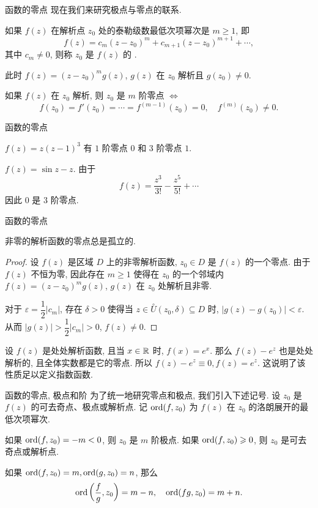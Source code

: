 \begin{frame}{函数的零点}
\onslide<+->
现在我们来研究极点与零点的联系.
\begin{definition}
如果 $f(z)$ 在解析点 $z_0$ 处的泰勒级数最低次项幂次是 $m\ge1$, 即
\[f(z)=c_m(z-z_0)^m+c_{m+1}(z-z_0)^{m+1}+\cdots,\]
其中 $c_m\neq 0$, 则称 $z_0$ 是 $f(z)$ 的 .
\end{definition}
\onslide<+->
此时 $f(z)=(z-z_0)^mg(z)$, $g(z)$ 在 $z_0$ 解析且 $g(z_0)\neq 0$.

\begin{theorem}
如果 $f(z)$ 在 $z_0$ 解析, 则 $z_0$ 是 $m$ 阶零点 $\iff$
\[f(z_0)=f'(z_0)=\cdots=f^{(m-1)}(z_0)=0,\quad
f^{(m)}(z_0)\neq 0.\]
\end{theorem}
\end{frame}


\begin{frame}{函数的零点}
\begin{example}
$f(z)=z(z-1)^3$
\onslide<+->
有 $1$ 阶零点 $0$ 和 $3$ 阶零点 $1$.
\end{example}
\begin{example}
$f(z)=\sin z-z$.
\onslide<+->
由于
\[f(z)=\frac{z^3}{3!}-\frac{z^5}{5!}+\cdots\]
因此 $0$ 是 $3$ 阶零点.
\end{example}
\end{frame}


\begin{frame}{函数的零点}
\begin{theorem}
非零的解析函数的零点总是孤立的.
\end{theorem}
\begin{proof}
\indent
设 $f(z)$ 是区域 $D$ 上的非零解析函数, $z_0\in D$ 是 $f(z)$ 的一个零点.
\onslide<+->
由于 $f(z)$ 不恒为零, 因此存在 $m\ge 1$ 使得在 $z_0$ 的一个邻域内 $f(z)=(z-z_0)^m g(z)$, $g(z)$ 在 $z_0$ 处解析且非零.

\indent
\onslide<+->
对于 $\varepsilon=\dfrac12|c_m|$, 存在 $\delta>0$ 使得当 $z\in \stackrel{\circ}{U}(z_0,\delta)\subseteq D$ 时, $|g(z)-g(z_0)|<\varepsilon$.
\onslide<+->
从而 $|g(z)|>\dfrac12|c_m|>0$, $f(z)\neq 0$.
\end{proof}

\onslide<+->
设 $f(z)$ 是处处解析函数, 且当 $x\in{\mathbb{R}}$ 时, $f(x)=e^x$.
\onslide<+->
那么 $f(z)-e^z$ 也是处处解析的, 且全体实数都是它的零点.
\onslide<+->
所以 $f(z)-e^z\equiv0,f(z)=e^z$.
\onslide<+->
这说明了该性质足以定义指数函数.
\end{frame}


\begin{frame}{函数的零点, 极点和阶}
\onslide<+->
为了统一地研究零点和极点, 我们引入下述记号.
\onslide<+->
设 $z_0$ 是 $f(z)$ 的可去奇点、极点或解析点.
\onslide<+->
记 ${\mathrm{ord}}(f,z_0)$ 为 $f(z)$ 在 $z_0$ 的洛朗展开的最低次项幂次.

\onslide<+->
如果 ${\mathrm{ord}}(f,z_0)=-m<0$, 则 $z_0$ 是 $m$ 阶极点.
\onslide<+->
如果 ${\mathrm{ord}}(f,z_0)\geqslant 0$, 则 $z_0$ 是可去奇点或解析点.

\begin{theorem}
如果 ${\mathrm{ord}}(f,z_0)=m,{\mathrm{ord}}(g,z_0)=n$, 那么
\[{\mathrm{ord}}\left(\frac fg,z_0\right)=m-n,\quad{\mathrm{ord}}(fg,z_0)=m+n.\]
\end{theorem}
\end{frame}


